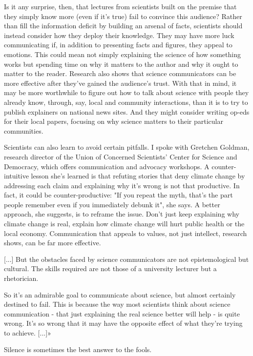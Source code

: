 	Is it any surprise, then, that lectures from scientists built on the premise that they simply know more (even if it's true) fail to convince this audience? Rather than fill the information deficit by building an arsenal of facts, scientists should instead consider how they deploy their knowledge. They may have more luck communicating if, in addition to presenting facts and figures, they appeal to emotions. This could mean not simply explaining the science of how something works but spending time on why it matters to the author and why it ought to matter to the reader. Research also shows that science communicators can be more effective after they've gained the audience's trust. With that in mind, it may be more worthwhile to figure out how to talk about science with people they already know, through, say, local and community interactions, than it is to try to publish explainers on national news sites. And they might consider writing op-eds for their local papers, focusing on why science matters to their particular communities.

	Scientists can also learn to avoid certain pitfalls. I spoke with Gretchen Goldman, research director of the Union of Concerned Scientists' Center for Science and Democracy, which offers communication and advocacy workshops. A counter-intuitive lesson she's learned is that refuting stories that deny climate change by addressing each claim and explaining why it's wrong is not that productive. In fact, it could be counter-productive: "If you repeat the myth, that's the part people remember even if you immediately debunk it", she says. A better approach, she suggests, is to reframe the issue. Don't just keep explaining why climate change is real, explain how climate change will hurt public health or the local economy. Communication that appeals to values, not just intellect, research shows, can be far more effective.

	[...] But the obstacles faced by science communicators are not epistemological but cultural. The skills required are not those of a university lecturer but a rhetorician.

	So it's an admirable goal to communicate about science, but almost certainly destined to fail. This is because the way most scientists think about science communication - that just explaining the real science better will help - is quite wrong. It's so wrong that it may have the opposite effect of what they're trying to achieve. [...]»
	
	\begin{fquote}Silence is sometimes the best answer to the fools.
 	\end{fquote}
	
